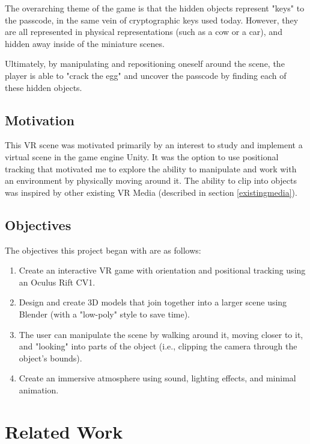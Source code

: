 \documentclass[10pt,twocolumn,letterpaper]{article}
\begin{document}
The overarching theme of the game is that the hidden objects represent "keys" to the passcode, in the same vein of cryptographic keys used today. However, they are all represented in physical representations (such as a cow or a car), and hidden away inside of the miniature scenes.

Ultimately, by manipulating and repositioning oneself around the scene, the player is able to "crack the egg" and uncover the passcode by finding each of these hidden objects.

\subsection{Motivation}

This VR scene was motivated primarily by an interest to study and implement a virtual scene in the game engine Unity. It was the option to use positional tracking that motivated me to explore the ability to manipulate and work with an environment by physically moving around it. The ability to clip into objects was inspired by other existing VR Media (described in section \ref{existingmedia}).
\subsection{Objectives}

The objectives this project began with are as follows:

\begin{enumerate}
  \item Create an interactive VR game with orientation and positional tracking using an Oculus Rift CV1.
  \item Design and create 3D models that join together into a larger scene using Blender (with a "low-poly" style to save time).
  \item The user can manipulate the scene by walking around it, moving closer to it, and "looking" into parts of the object (i.e., clipping the camera through the object's bounds).
  \item Create an immersive atmosphere using sound, lighting effects, and minimal animation.
\end{enumerate}


\section{Related Work}
\end{document}
